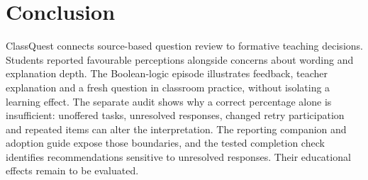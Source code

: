 \section{Conclusion}
ClassQuest connects source-based question review to formative teaching decisions. Students reported favourable perceptions alongside concerns about wording and explanation depth. The Boolean-logic episode illustrates feedback, teacher explanation and a fresh question in classroom practice, without isolating a learning effect. The separate audit shows why a correct percentage alone is insufficient: unoffered tasks, unresolved responses, changed retry participation and repeated items can alter the interpretation. The reporting companion and adoption guide expose those boundaries, and the tested completion check identifies recommendations sensitive to unresolved responses. Their educational effects remain to be evaluated.



